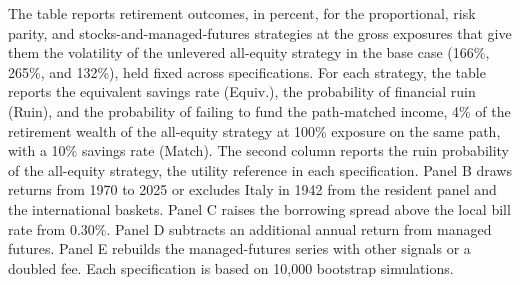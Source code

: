 \begin{table}[p]\centering
\caption{Retirement outcomes at equal volatility under alternative assumptions}\label{tab:sensitivity}
\begin{minipage}{\linewidth}\small The table reports retirement outcomes, in percent, for the proportional, risk parity, and stocks-and-managed-futures strategies at the gross exposures that give them the volatility of the unlevered all-equity strategy in the base case (166\%, 265\%, and 132\%), held fixed across specifications. For each strategy, the table reports the equivalent savings rate (Equiv.), the probability of financial ruin (Ruin), and the probability of failing to fund the path-matched income, 4\% of the retirement wealth of the all-equity strategy at 100\% exposure on the same path, with a 10\% savings rate (Match). The second column reports the ruin probability of the all-equity strategy, the utility reference in each specification. Panel B draws returns from 1970 to 2025 or excludes Italy in 1942 from the resident panel and the international baskets. Panel C raises the borrowing spread above the local bill rate from 0.30\%. Panel D subtracts an additional annual return from managed futures. Panel E rebuilds the managed-futures series with other signals or a doubled fee. Each specification is based on 10,000 bootstrap simulations.\end{minipage}
\medskip


\end{table}
